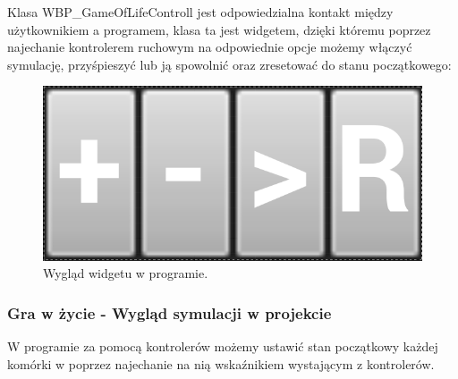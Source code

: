 \documentclass[a4paper,12pt,reqno]{article}
\begin{document}
Klasa WBP\_GameOfLifeControll jest odpowiedzialna kontakt między użytkownikiem a programem, klasa ta jest widgetem, dzięki któremu poprzez najechanie kontrolerem ruchowym na odpowiednie opcje możemy włączyć symulację, przyśpieszyć lub ją spowolnić oraz zresetować do stanu początkowego:

\begin{figure}[!ht]%
\centering
\includegraphics[width=0.7\columnwidth]{graphics/gameoflife/GameOfLifeControllInUE_1.png}
\caption{Wygląd widgetu w programie.
\label{BPExample}}%
%
\qquad
\end{figure}  

\subsubsection{Gra w życie - Wygląd symulacji w projekcie}
W programie za pomocą kontrolerów możemy ustawić stan początkowy każdej komórki w poprzez najechanie na nią wskaźnikiem wystającym z kontrolerów.
\end{document}
